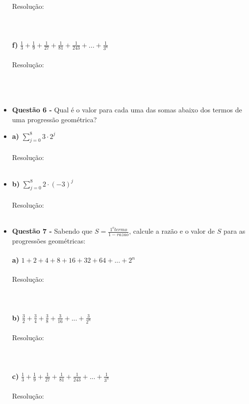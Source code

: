 \documentclass[a4paper,12pt]{article}
\begin{document}
\begin{itemize}
    \\\\Resolução:
    \\\\
    \\\\
    \textbf{f)} $\frac{1}{3} + \frac{1}{9} + \frac{1}{27} + \frac{1}{81} + \frac{1}{243} + ... + \frac{1}{3^n}$
    \\\\Resolução:
    \\\\
    \\\\
    \item[] \textbf{Questão 6 -} Qual é o valor para cada uma das somas abaixo dos termos de uma progressão geométrica?
    \\\item[] \textbf{a)} $\sum\limits_{j=0}^8 3\cdot 2^j$
    \\\\Resolução:
    \\\\
    \item[] \textbf{b)} $\sum\limits_{j=0}^8 2\cdot (-3)^j$
    \\\\Resolução:
    \\\\
    \item[] \textbf{Questão 7 -} Sabendo que $S = \frac{1^o termo}{1 - razao}$, calcule a razão e o valor de $S$ para as progressões geométricas:
    \\\\\textbf{a)} $1 + 2 + 4 + 8 + 16 + 32 + 64 + ... + 2^n$
    \\\\Resolução:
    \\\\
    \\\\
    \textbf{b)} $\frac{3}{2} + \frac{3}{4} + \frac{3}{8} + \frac{3}{16} + ... + \frac{3}{2^n}$
    \\\\Resolução:
    \\\\
    \\\\
    \textbf{c)} $\frac{1}{3} + \frac{1}{9} + \frac{1}{27} + \frac{1}{81} + \frac{1}{243} + ... + \frac{1}{3^n}$
    \\\\Resolução:
    \\\\
    \\\\
     
\end{itemize}
   
\end{document}
